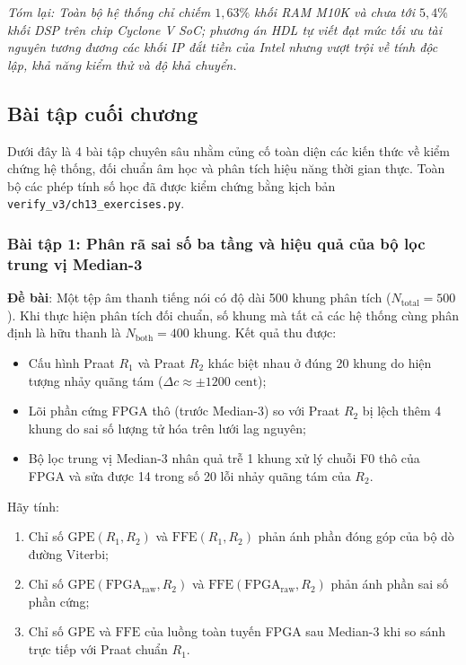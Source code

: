 \textit{Tóm lại: Toàn bộ hệ thống chỉ chiếm $1{,}63\%$ khối RAM M10K và chưa tới $5{,}4\%$ khối DSP trên chip Cyclone V SoC; phương án HDL tự viết đạt mức tối ưu tài nguyên tương đương các khối IP đắt tiền của Intel nhưng vượt trội về tính độc lập, khả năng kiểm thử và độ khả chuyển.}

\subsection*{Bài tập cuối chương}

Dưới đây là 4 bài tập chuyên sâu nhằm củng cố toàn diện các kiến thức về kiểm chứng hệ thống, đối chuẩn âm học và phân tích hiệu năng thời gian thực. Toàn bộ các phép tính số học đã được kiểm chứng bằng kịch bản \texttt{verify\_v3/ch13\_exercises.py}.

\subsubsection*{Bài tập 1: Phân rã sai số ba tầng và hiệu quả của bộ lọc trung vị Median-3}
\textbf{Đề bài}: Một tệp âm thanh tiếng nói có độ dài 500 khung phân tích ($N_{\text{total}} = 500$). Khi thực hiện phân tích đối chuẩn, số khung mà tất cả các hệ thống cùng phân định là hữu thanh là $N_{\text{both}} = 400\text{ khung}$. Kết quả thu được:
\begin{itemize}
    \item Cấu hình Praat $R_1$ và Praat $R_2$ khác biệt nhau ở đúng 20 khung do hiện tượng nhảy quãng tám ($\Delta c \approx \pm 1200\text{ cent}$);
    \item Lõi phần cứng FPGA thô (trước Median-3) so với Praat $R_2$ bị lệch thêm 4 khung do sai số lượng tử hóa trên lưới lag nguyên;
    \item Bộ lọc trung vị Median-3 nhân quả trễ 1 khung xử lý chuỗi F0 thô của FPGA và sửa được 14 trong số 20 lỗi nhảy quãng tám của $R_2$.
\end{itemize}
Hãy tính:
\begin{enumerate}[label=(\alph*)]
    \item Chỉ số $\text{GPE}(R_1, R_2)$ và $\text{FFE}(R_1, R_2)$ phản ánh phần đóng góp của bộ dò đường Viterbi;
    \item Chỉ số $\text{GPE}(\text{FPGA}_{\text{raw}}, R_2)$ và $\text{FFE}(\text{FPGA}_{\text{raw}}, R_2)$ phản ánh phần sai số phần cứng;
    \item Chỉ số $\text{GPE}$ và $\text{FFE}$ của luồng toàn tuyến FPGA sau Median-3 khi so sánh trực tiếp với Praat chuẩn $R_1$.
\end{enumerate}

